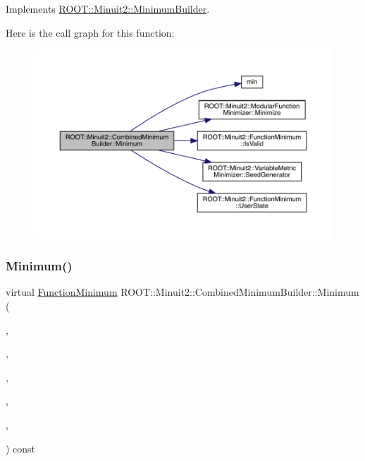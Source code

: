 Implements \mbox{\hyperlink{classROOT_1_1Minuit2_1_1MinimumBuilder_aefaa624436afa8195af1f3393a35981f}{R\+O\+O\+T\+::\+Minuit2\+::\+Minimum\+Builder}}.

Here is the call graph for this function\+:\nopagebreak
\begin{figure}[H]
\begin{center}
\leavevmode
\includegraphics[width=350pt]{d9/d31/classROOT_1_1Minuit2_1_1CombinedMinimumBuilder_a44282b6271b536b7fc6b80af16ac67ef_cgraph}
\end{center}
\end{figure}
\mbox{\label{classROOT_1_1Minuit2_1_1CombinedMinimumBuilder_a5439a04b01ff94a8f790443b867d6e53}} 
\subsubsection{\texorpdfstring{Minimum()}{Minimum()}\hspace{0.1cm}{\footnotesize\ttfamily [2/2]}}
{\footnotesize\ttfamily virtual \mbox{\hyperlink{classROOT_1_1Minuit2_1_1FunctionMinimum}{Function\+Minimum}} R\+O\+O\+T\+::\+Minuit2\+::\+Combined\+Minimum\+Builder\+::\+Minimum (\begin{DoxyParamCaption}\item[{const \mbox{\hyperlink{classROOT_1_1Minuit2_1_1MnFcn}{Mn\+Fcn}} \&}]{,  }\item[{const \mbox{\hyperlink{classROOT_1_1Minuit2_1_1GradientCalculator}{Gradient\+Calculator}} \&}]{,  }\item[{const \mbox{\hyperlink{classROOT_1_1Minuit2_1_1MinimumSeed}{Minimum\+Seed}} \&}]{,  }\item[{const \mbox{\hyperlink{classROOT_1_1Minuit2_1_1MnStrategy}{Mn\+Strategy}} \&}]{,  }\item[{unsigned int}]{,  }\item[{double}]{ }\end{DoxyParamCaption}) const\hspace{0.3cm}{\ttfamily [virtual]}}



